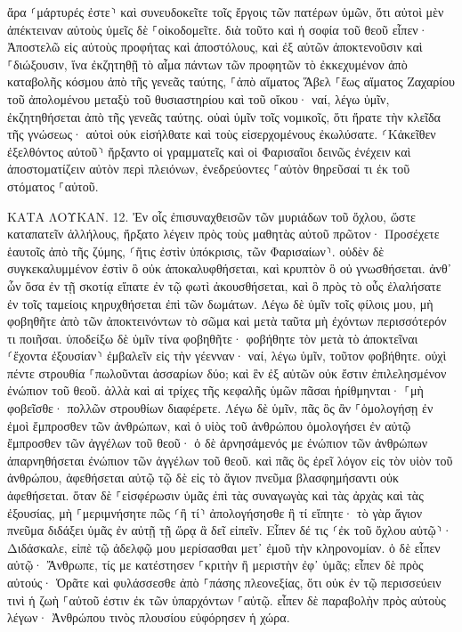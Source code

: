 \documentclass[twoside, 9pt]{extreport}
\begin{document}
ἄρα ⸂μάρτυρές ἐστε⸃ καὶ συνευδοκεῖτε τοῖς ἔργοις τῶν πατέρων ὑμῶν, ὅτι αὐτοὶ μὲν ἀπέκτειναν αὐτοὺς ὑμεῖς δὲ ⸀οἰκοδομεῖτε. 
διὰ τοῦτο καὶ ἡ σοφία τοῦ θεοῦ εἶπεν· Ἀποστελῶ εἰς αὐτοὺς προφήτας καὶ ἀποστόλους, καὶ ἐξ αὐτῶν ἀποκτενοῦσιν καὶ ⸀διώξουσιν, 
ἵνα ἐκζητηθῇ τὸ αἷμα πάντων τῶν προφητῶν τὸ ἐκκεχυμένον ἀπὸ καταβολῆς κόσμου ἀπὸ τῆς γενεᾶς ταύτης, 
⸀ἀπὸ αἵματος Ἅβελ ⸀ἕως αἵματος Ζαχαρίου τοῦ ἀπολομένου μεταξὺ τοῦ θυσιαστηρίου καὶ τοῦ οἴκου· ναί, λέγω ὑμῖν, ἐκζητηθήσεται ἀπὸ τῆς γενεᾶς ταύτης. 
οὐαὶ ὑμῖν τοῖς νομικοῖς, ὅτι ἤρατε τὴν κλεῖδα τῆς γνώσεως· αὐτοὶ οὐκ εἰσήλθατε καὶ τοὺς εἰσερχομένους ἐκωλύσατε. 
⸂Κἀκεῖθεν ἐξελθόντος αὐτοῦ⸃ ἤρξαντο οἱ γραμματεῖς καὶ οἱ Φαρισαῖοι δεινῶς ἐνέχειν καὶ ἀποστοματίζειν αὐτὸν περὶ πλειόνων, 
ἐνεδρεύοντες ⸀αὐτὸν θηρεῦσαί τι ἐκ τοῦ στόματος ⸀αὐτοῦ. 

ΚΑΤΑ ΛΟΥΚΑΝ.
12.
Ἐν οἷς ἐπισυναχθεισῶν τῶν μυριάδων τοῦ ὄχλου, ὥστε καταπατεῖν ἀλλήλους, ἤρξατο λέγειν πρὸς τοὺς μαθητὰς αὐτοῦ πρῶτον· Προσέχετε ἑαυτοῖς ἀπὸ τῆς ζύμης, ⸂ἥτις ἐστὶν ὑπόκρισις, τῶν Φαρισαίων⸃. 
οὐδὲν δὲ συγκεκαλυμμένον ἐστὶν ὃ οὐκ ἀποκαλυφθήσεται, καὶ κρυπτὸν ὃ οὐ γνωσθήσεται. 
ἀνθ᾽ ὧν ὅσα ἐν τῇ σκοτίᾳ εἴπατε ἐν τῷ φωτὶ ἀκουσθήσεται, καὶ ὃ πρὸς τὸ οὖς ἐλαλήσατε ἐν τοῖς ταμείοις κηρυχθήσεται ἐπὶ τῶν δωμάτων. 
Λέγω δὲ ὑμῖν τοῖς φίλοις μου, μὴ φοβηθῆτε ἀπὸ τῶν ἀποκτεινόντων τὸ σῶμα καὶ μετὰ ταῦτα μὴ ἐχόντων περισσότερόν τι ποιῆσαι. 
ὑποδείξω δὲ ὑμῖν τίνα φοβηθῆτε· φοβήθητε τὸν μετὰ τὸ ἀποκτεῖναι ⸂ἔχοντα ἐξουσίαν⸃ ἐμβαλεῖν εἰς τὴν γέενναν· ναί, λέγω ὑμῖν, τοῦτον φοβήθητε. 
οὐχὶ πέντε στρουθία ⸀πωλοῦνται ἀσσαρίων δύο; καὶ ἓν ἐξ αὐτῶν οὐκ ἔστιν ἐπιλελησμένον ἐνώπιον τοῦ θεοῦ. 
ἀλλὰ καὶ αἱ τρίχες τῆς κεφαλῆς ὑμῶν πᾶσαι ἠρίθμηνται· ⸀μὴ φοβεῖσθε· πολλῶν στρουθίων διαφέρετε. 
Λέγω δὲ ὑμῖν, πᾶς ὃς ἂν ⸀ὁμολογήσῃ ἐν ἐμοὶ ἔμπροσθεν τῶν ἀνθρώπων, καὶ ὁ υἱὸς τοῦ ἀνθρώπου ὁμολογήσει ἐν αὐτῷ ἔμπροσθεν τῶν ἀγγέλων τοῦ θεοῦ· 
ὁ δὲ ἀρνησάμενός με ἐνώπιον τῶν ἀνθρώπων ἀπαρνηθήσεται ἐνώπιον τῶν ἀγγέλων τοῦ θεοῦ. 
καὶ πᾶς ὃς ἐρεῖ λόγον εἰς τὸν υἱὸν τοῦ ἀνθρώπου, ἀφεθήσεται αὐτῷ τῷ δὲ εἰς τὸ ἅγιον πνεῦμα βλασφημήσαντι οὐκ ἀφεθήσεται. 
ὅταν δὲ ⸀εἰσφέρωσιν ὑμᾶς ἐπὶ τὰς συναγωγὰς καὶ τὰς ἀρχὰς καὶ τὰς ἐξουσίας, μὴ ⸀μεριμνήσητε πῶς ⸂ἢ τί⸃ ἀπολογήσησθε ἢ τί εἴπητε· 
τὸ γὰρ ἅγιον πνεῦμα διδάξει ὑμᾶς ἐν αὐτῇ τῇ ὥρᾳ ἃ δεῖ εἰπεῖν. 
Εἶπεν δέ τις ⸂ἐκ τοῦ ὄχλου αὐτῷ⸃· Διδάσκαλε, εἰπὲ τῷ ἀδελφῷ μου μερίσασθαι μετ᾽ ἐμοῦ τὴν κληρονομίαν. 
ὁ δὲ εἶπεν αὐτῷ· Ἄνθρωπε, τίς με κατέστησεν ⸀κριτὴν ἢ μεριστὴν ἐφ᾽ ὑμᾶς; 
εἶπεν δὲ πρὸς αὐτούς· Ὁρᾶτε καὶ φυλάσσεσθε ἀπὸ ⸀πάσης πλεονεξίας, ὅτι οὐκ ἐν τῷ περισσεύειν τινὶ ἡ ζωὴ ⸀αὐτοῦ ἐστιν ἐκ τῶν ὑπαρχόντων ⸀αὐτῷ. 
εἶπεν δὲ παραβολὴν πρὸς αὐτοὺς λέγων· Ἀνθρώπου τινὸς πλουσίου εὐφόρησεν ἡ χώρα. 
\end{document}
